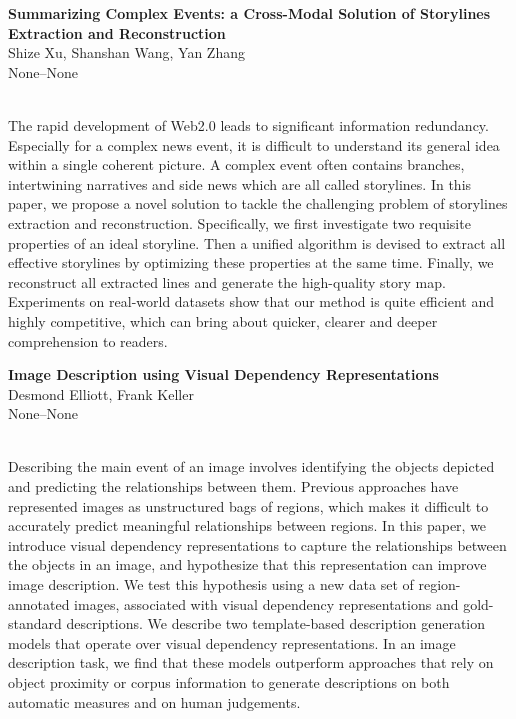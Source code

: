 \documentclass[twoside,makeidx]{book}
\begin{document}
\par\vspace{2em}\noindent%
\begin{minipage}{\linewidth}%
\begin{center}
\textbf{\normalsize Summarizing Complex Events: a Cross-Modal Solution of Storylines Extraction and Reconstruction}\\
\normalsize  Shize Xu,  Shanshan Wang,  Yan Zhang\\
{\small None--None}\\
\end{center}
\end{minipage}\\[0.5em]
\nopagebreak%
\noindent%
{\small The rapid development of Web2.0 leads to significant information redundancy. Especially for a complex news event, it is difficult to understand its general idea within a single coherent picture. A complex event often contains branches, intertwining narratives and side news which are all called storylines. In this paper, we propose a novel solution to tackle the challenging problem of storylines extraction and reconstruction. Specifically, we first investigate two requisite properties of an ideal storyline. Then a unified algorithm is devised to extract all effective storylines by optimizing these properties at the same time. Finally, we reconstruct all extracted lines and generate the high-quality story map. Experiments on real-world datasets show that our method is quite efficient and highly competitive, which can bring about quicker, clearer and deeper comprehension to readers.}
\par\vspace{2em}\noindent%
\begin{minipage}{\linewidth}%
\begin{center}
\textbf{\normalsize Image Description using Visual Dependency Representations}\\
\normalsize  Desmond Elliott,  Frank Keller\\
{\small None--None}\\
\end{center}
\end{minipage}\\[0.5em]
\nopagebreak%
\noindent%
{\small Describing the main event of an image involves identifying the objects depicted and predicting the relationships between them. Previous approaches have represented images as unstructured bags of regions, which makes it difficult to accurately predict meaningful relationships between regions. In this paper, we introduce visual dependency representations to capture the relationships between the objects in an image, and hypothesize that this representation can improve image description.  We test this hypothesis using a new data set of region-annotated images, associated with visual dependency representations and gold-standard descriptions. We describe two template-based description generation models that operate over visual dependency representations. In an image description task, we find that these models outperform approaches that rely on object proximity or corpus information to generate descriptions on both automatic measures and on human judgements.}
\end{document}
